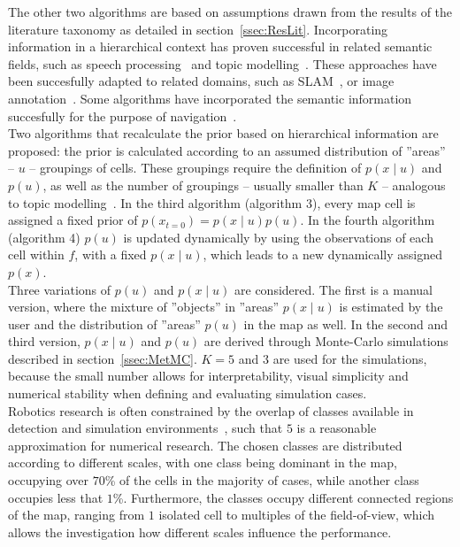 \documentclass[twocolumn,letterpaper]{IEEEAerospaceCLS}  %
\begin{document}
The other two algorithms are based on assumptions drawn from the results of the literature taxonomy as detailed in section~\ref{ssec:ResLit}. Incorporating information in a hierarchical context has proven successful in related semantic fields, such as speech processing~\cite{fine_hierarchical_1998} and topic modelling~\cite{blei_latent_2003}. These approaches have been succesfully adapted to related domains, such as SLAM~\cite{zhang_hierarchical_2019}, or image annotation~\cite{fei-fei_bayesian_2005,lienou_semantic_2010}. Some algorithms have incorporated the semantic information succesfully for the purpose of navigation~\cite{koch_automatic_2019,chaplot_object_2020,wu_learning_2018,alirezaie_exploiting_2017}.\\
Two algorithms  that recalculate the prior based on hierarchical information are proposed: the prior is calculated according to an assumed distribution of ''areas'' -- $u$ -- groupings of cells. These groupings require the definition of $p(x\mid u)$ and $p(u)$, as well as the number of groupings -- usually smaller than $K$ -- analogous to topic modelling~\cite{blei_latent_2003}. In the third algorithm (algorithm 3), every map cell is assigned a fixed prior of $p(x_{t=0}) = p(x\mid u)p(u)$. In the fourth algorithm (algorithm 4) $p(u)$ is updated dynamically by using the observations of each cell within $f$, with a fixed $p(x\mid u)$, which leads to a new dynamically assigned $p(x)$.\\
Three variations of $p(u)$ and $p(x\mid u)$ are considered. The first is a manual version, where the mixture of ''objects'' in ''areas'' $p(x\mid u)$ is estimated by the user and the distribution of ''areas'' $p(u)$ in the map as well. In the second and third version, $p(x\mid u)$ and $p(u)$ are derived through Monte-Carlo simulations described in section~\ref{ssec:MetMC}. $K=5$ and $3$ are used for the simulations, because the small number allows for interpretability, visual simplicity and numerical stability when defining and evaluating simulation cases.\\
Robotics research is often constrained by the overlap of classes available in detection and simulation environments~\cite{chaplot_object_2020}, such that $5$ is a reasonable approximation for numerical research. The chosen classes are distributed according to different scales, with one class being dominant in the map, occupying over $70$\% of the cells in the majority of cases, while another class occupies less that $1$\%. Furthermore, the classes occupy different connected regions of the map, ranging from $1$ isolated cell to multiples of the field-of-view, which allows the investigation how different scales influence the performance.\\
\end{document}
